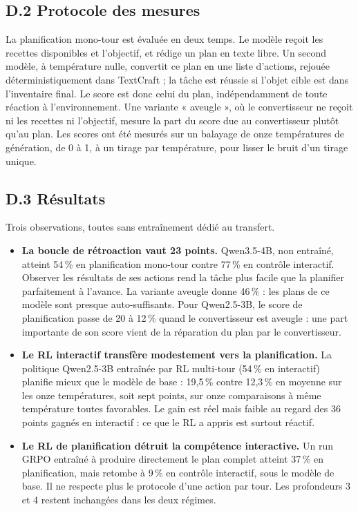 \documentclass[11pt,a4paper]{article}
\begin{document}
\subsection*{D.2 Protocole des mesures}
La planification mono-tour est évaluée en deux temps. Le modèle reçoit les recettes disponibles et l'objectif, et rédige un plan en texte libre. Un second modèle, à température nulle, convertit ce plan en une liste d'actions, rejouée déterministiquement dans TextCraft ; la tâche est réussie si l'objet cible est dans l'inventaire final. Le score est donc celui du plan, indépendamment de toute réaction à l'environnement. Une variante « aveugle », où le convertisseur ne reçoit ni les recettes ni l'objectif, mesure la part du score due au convertisseur plutôt qu'au plan. Les scores ont été mesurés sur un balayage de onze températures de génération, de 0 à 1, à un tirage par température, pour lisser le bruit d'un tirage unique.

\subsection*{D.3 Résultats}
Trois observations, toutes sans entraînement dédié au transfert.

\begin{itemize}
    \item \textbf{La boucle de rétroaction vaut 23 points.} Qwen3.5-4B, non entraîné, atteint 54\,\% en planification mono-tour contre 77\,\% en contrôle interactif. Observer les résultats de ses actions rend la tâche plus facile que la planifier parfaitement à l'avance. La variante aveugle donne 46\,\% : les plans de ce modèle sont presque auto-suffisants. Pour Qwen2.5-3B, le score de planification passe de 20 à 12\,\% quand le convertisseur est aveugle : une part importante de son score vient de la réparation du plan par le convertisseur.
    \item \textbf{Le RL interactif transfère modestement vers la planification.} La politique Qwen2.5-3B entraînée par RL multi-tour (54\,\% en interactif) planifie mieux que le modèle de base : 19{,}5\,\% contre 12{,}3\,\% en moyenne sur les onze températures, soit sept points, sur onze comparaisons à même température toutes favorables. Le gain est réel mais faible au regard des 36 points gagnés en interactif : ce que le RL a appris est surtout réactif.
    \item \textbf{Le RL de planification détruit la compétence interactive.} Un run GRPO entraîné à produire directement le plan complet atteint 37\,\% en planification, mais retombe à 9\,\% en contrôle interactif, sous le modèle de base. Il ne respecte plus le protocole d'une action par tour. Les profondeurs 3 et 4 restent inchangées dans les deux régimes.
\end{itemize}
\end{document}
